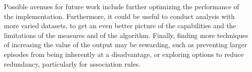 Possible avenues for future work include further optimizing the performance of the implementation. Furthermore, it could be useful to conduct analysis with more varied datasets, to get an even better picture of the capabilities and the limitations of the measures and of the algorithm. Finally, finding more techniques of increasing the value of the output may be rewarding, such as preventing larger episodes from being inherently at a disadvantage, or exploring options to reduce redundancy, particularly for association rules.
